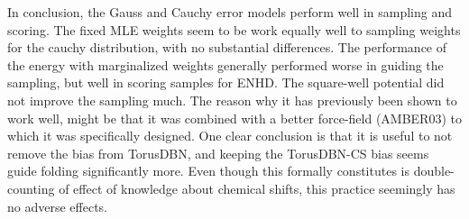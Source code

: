 In conclusion, the Gauss and Cauchy error models perform well in sampling and scoring.
The fixed MLE weights seem to be work equally well to sampling weights for the cauchy distribution, with no substantial differences.
The performance of the energy with marginalized weights generally performed worse in guiding the sampling, but well in scoring samples for ENHD.
The square-well potential did not improve the sampling much.
The reason why it has previously been shown to work well, might be that it was combined with a better force-field (AMBER03) to which it was specifically designed.
One clear conclusion is that it is useful to not remove the bias from TorusDBN, and keeping the TorusDBN-CS bias seems guide folding significantly more. Even though this formally constitutes is double-counting of effect of knowledge about chemical shifts, this practice seemingly has no adverse effects.




